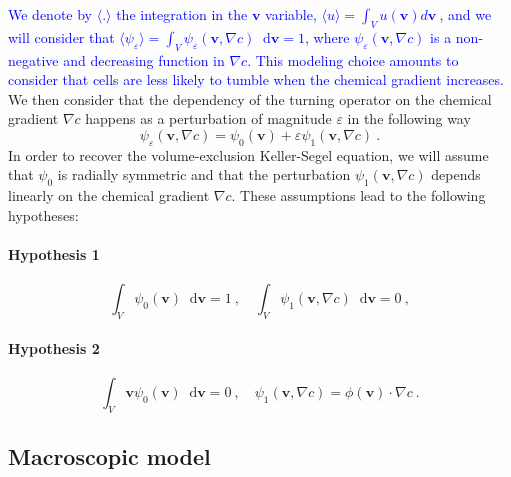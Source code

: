 \documentclass{article}
\newcommand {\bv} { {\mathbf{v}} }
\newcommand*\diff{\mathop{}\!\mathrm{d}}
\begin{document}
\textcolor{blue}{We denote by $\langle. \rangle$ the integration in the $\mathbf{v}$ variable, $\langle u \rangle=\int_V u(\mathbf{v}) d \bv\ $, and we will consider that $\langle\psi_\varepsilon \rangle = \int_V \psi_\varepsilon (\mathbf{v},\nabla c) \diff \mathbf{v} = 1$, where $\psi_\varepsilon(\mathbf{v},\nabla c)$ is a non-negative and decreasing function in $\nabla c$. This modeling choice amounts to consider that cells are less likely to tumble when the chemical gradient increases.} We then consider that the dependency of the turning operator on the chemical gradient $\nabla c$ happens as a perturbation of magnitude $\varepsilon$ in the following way
\begin{equation}\label{expansion_psi}
    \psi_\varepsilon(\mathbf{v},\nabla c)=\psi_0(\mathbf{v})+\varepsilon\psi_1(\mathbf{v},\nabla c)\ .
\end{equation}
In order to recover the volume-exclusion Keller-Segel equation, we will assume that $\psi_0$ is radially symmetric and that the perturbation $\psi_1(\mathbf{v},\nabla c)$ depends linearly on the chemical gradient $\nabla c$. These assumptions lead to the following hypotheses: 
\paragraph{Hypothesis 1}
\begin{equation}\tag{H1}
    \int_V\psi_0(\mathbf{v})\diff \mathbf{v}=1\ , \quad \int_V\psi_1(\mathbf{v},\nabla c)\diff \mathbf{v}=0\ ,\label{hypo1}
\end{equation}
\paragraph{Hypothesis 2}
\begin{equation}\tag{H2}
\int_V \mathbf{v}\psi_0(\mathbf{v})\diff \mathbf{v}=0\ , \quad \psi_1(\mathbf{v},\nabla c) = \phi(\mathbf{v}) \cdot \nabla c\ . \label{hypo2}
\end{equation}



\subsection{Macroscopic model}\label{sec:macroscopic derivation} 
\end{document}
